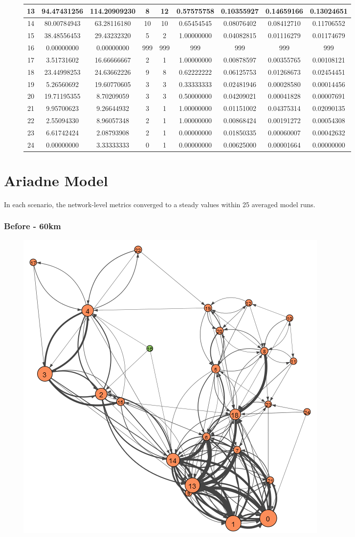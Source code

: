 \documentclass[12pt,a4paper]{thesis}
\begin{document}
\begin{figure}[H]
\begin{tabular}{|c|c|c|c|c|c|c|c|c|}
\hline	13	&	94.47431256	&	114.20909230	&	8	&	12	&	0.57575758	&	0.10355927	&	0.14659166	&	0.13024651	\\
\hline	14	&	80.00784943	&	63.28116180	&	10	&	10	&	0.65454545	&	0.08076402	&	0.08412710	&	0.11706552	\\
\hline	15	&	38.48556453	&	29.43232320	&	5	&	2	&	1.00000000	&	0.04082815	&	0.01116279	&	0.01174679	\\
\hline	16	&	0.00000000	&	0.00000000	&	999	&	999	&	999	&	999	&	999	&	999	\\
\hline	17	&	3.51731602	&	16.66666667	&	2	&	1	&	1.00000000	&	0.00878597	&	0.00355765	&	0.00108121	\\
\hline	18	&	23.44998253	&	24.63662226	&	9	&	8	&	0.62222222	&	0.06125753	&	0.01268673	&	0.02454451	\\
\hline	19	&	5.26560692	&	19.60770605	&	3	&	3	&	0.33333333	&	0.02481946	&	0.00028580	&	0.00014456	\\
\hline	20	&	19.71195355	&	8.70209059	&	3	&	3	&	0.50000000	&	0.04209021	&	0.00041828	&	0.00007691	\\
\hline	21	&	9.95700623	&	9.26644932	&	3	&	1	&	1.00000000	&	0.01151002	&	0.04375314	&	0.02090135	\\
\hline	22	&	2.55094330	&	8.96057348	&	2	&	1	&	1.00000000	&	0.00868424	&	0.00191272	&	0.00054308	\\
\hline	23	&	6.61742424	&	2.08793908	&	2	&	1	&	0.00000000	&	0.01850335	&	0.00060007	&	0.00042632	\\
\hline	24	&	0.00000000	&	3.33333333	&	0	&	1	&	0.00000000	&	0.00625000	&	0.00001664	&	0.00000000	\\
\hline 
\end{tabular} 
\end{figure}

\section{Ariadne Model}

\paragraph{}
In each scenario, the network-level metrics converged to a steady values within 25 averaged model runs.

\subsubsection{Before - 60km}

\begin{figure}[H]
\centering
\includegraphics[width=0.35\linewidth]{./BeforeViz/ariadne60}
\caption{}
\label{fig:ariadneB60}
\end{figure}
\end{document}
